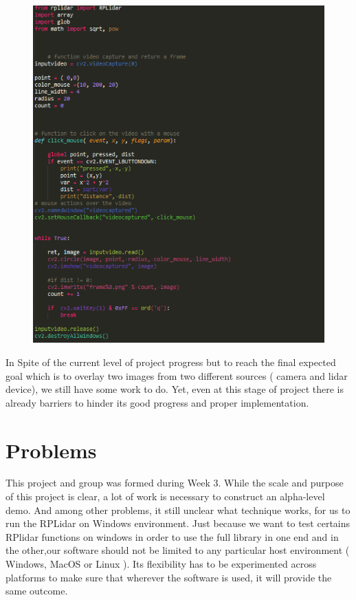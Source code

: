 \documentclass[onecolumn, draftclsnofoot,10pt, compsoc]{IEEEtran}
\begin{document}
\begin{singlespace}
			\begin{figure}[here]
				\includegraphics[scale=0.4, width=\textwidth]{videocapture.PNG}
				\label{videocapture}
			\end{figure}
			
	In Spite of the current level of project progress but  to reach the final expected goal which is to overlay two images from two different sources ( camera and lidar device), we still have some work to do. Yet, even at this stage of project there is already barriers to hinder its good progress and  proper implementation. 
	\cite{guiprogramming}
	\cite{python}
	\cite{cplusplus}
		\section{Problems}
		This project and group was formed during Week 3. While the scale and purpose of this project is clear, a lot of work is necessary to construct an alpha-level demo. And among other problems, it still unclear what technique works, for us to run the RPLidar on Windows environment. Just because we want to test certains RPlidar functions on windows in order to use the full library in one end and in the other,our software should not be limited to any particular host environment ( Windows, MacOS or Linux ). Its  flexibility has to be experimented across platforms to make sure that wherever the software is used, it will provide the same outcome.

		
\end{singlespace}
\end{document}
